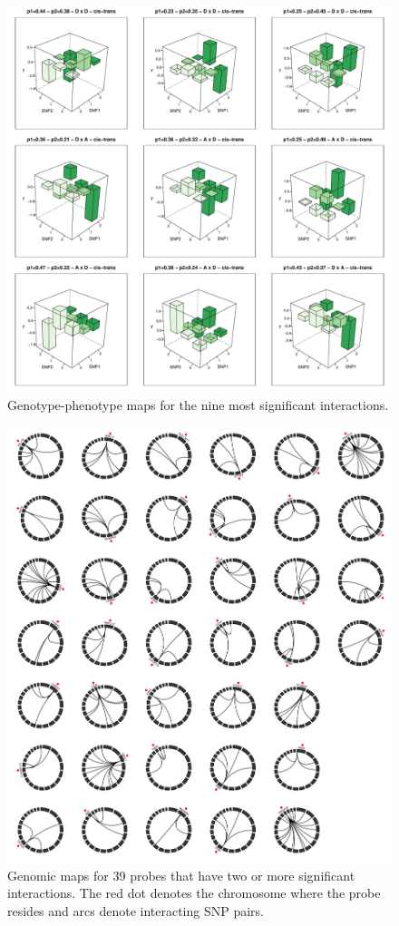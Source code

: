 \documentclass[paper=a4, fontsize=11pt]{scrartcl}	%
\numberwithin{equation}{section}									%
\numberwithin{figure}{section}										%
\numberwithin{table}{section}										%
\begin{document}
\begin{figure}[p]
	\centering
	\includegraphics[width=15cm]{images/3dplots}
	\caption{Genotype-phenotype maps for the nine most significant interactions.}
	\label{fig:3dplots}
\end{figure}

\begin{figure}[p]
	\centering
	\includegraphics[width=15cm]{images/circos}
	\caption{Genomic maps for 39 probes that have two or more significant interactions. The red dot denotes the chromosome where the probe resides and arcs denote interacting SNP pairs.}
	\label{fig:circos}
\end{figure}
\end{document}
